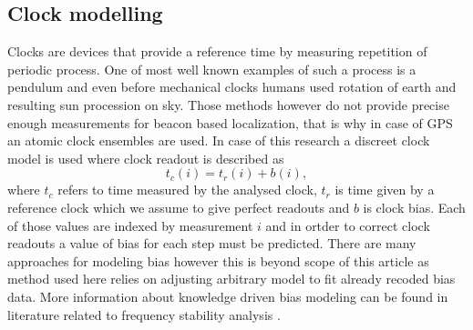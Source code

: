 \documentclass{kybernetika}
\begin{document}
\subsection{Clock modelling}
Clocks are devices that provide a reference time by measuring repetition of periodic 
process. One of most well known examples of such a process is a pendulum and even before
mechanical clocks humans used rotation of earth and resulting sun procession on sky.
Those methods however do not provide precise enough measurements for beacon based localization,
that is why in case of GPS an atomic clock ensembles are used.
In case of this research a discreet clock model is used where clock readout is described as 
\begin{equation}
	t_{c}(i) = t_{r}(i) + b(i),
\end{equation}
where $t_{c}$ refers to time measured by the analysed clock, $t_{r}$ is time given by a 
reference clock which we assume to give perfect readouts and $b$ is clock bias.
Each of those values are indexed by measurement $i$ and in ortder to correct clock readouts
a value of bias for each step must be predicted.
There are many approaches for modeling bias however this is beyond scope of this article
as method used here relies on adjusting arbitrary model to fit already recoded bias data.
More information about knowledge driven bias modeling can be found in literature related to
frequency stability analysis \cite{Riley2007}.

\end{document}
